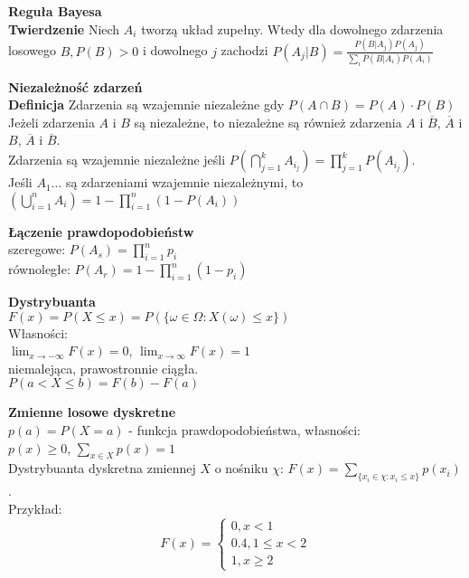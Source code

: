 \documentclass[10pt,landscape,a4paper,notitlepage]{article}
\begin{document}
\begin{multicols*}{4}
        \noindent \textbf{\large Reguła Bayesa}\\
        \textbf{Twierdzenie} Niech $A_i$ tworzą układ zupełny. Wtedy dla dowolnego zdarzenia losowego $B, P(B)>0$ i dowolnego $j$ zachodzi $P(A_j|B)=\frac{P(B|A_j)P(A_j)}{\sum_iP(B|A_i)P(A_i)}$

        \noindent \textbf{\large Niezależność zdarzeń}\\
        \textbf{Definicja} Zdarzenia są wzajemnie niezależne gdy $P(A\cap B)=P(A)\cdot P(B)$\\
        Jeżeli zdarzenia $A$ i $B$ są niezależne, to niezależne są również zdarzenia $A$ i $\overline{B}$, $\overline{A}$ i $B$, $\overline{A}$ i $\overline{B}$.\\
        Zdarzenia są wzajemnie niezależne jeśli $P\left(\bigcap_{j=1}^kA_{i_j}\right) = \prod_{j=1}^kP(A_{i_j})$.\\
        Jeśli $A_1\ldots$ są zdarzeniami wzajemnie niezależnymi, to $\left(\bigcup_{i=1}^nA_i\right)=1-\prod_{i=1}^n(1-P(A_i))$

        \noindent\textbf{\large Łączenie prawdopodobieństw}\\
        szeregowe: $P(A_s)=\prod_{i=1}^np_i$\\
        równoległe: $P(A_r)=1-\prod_{i=1}^n(1-p_i)$

        \noindent\textbf{\large Dystrybuanta}\\
        $F(x)=P(X\leq x) = P(\{\omega\in\Omega : X(\omega)\leq x\})$\\
        Własności:\\
        $\lim_{x\rightarrow-\infty}F(x)=0$, $\lim_{x\rightarrow\infty}F(x)=1$\\
        niemalejąca, prawostronnie ciągła.\\
        $P(a<X\leq b)=F(b)-F(a)$

        \noindent\textbf{\large Zmienne losowe dyskretne}\\
        $p(a) = P(X=a)$ - funkcja prawdopodobieństwa, własności:\\
        $p(x)\geq 0$, $\sum_{x\in X}p(x)=1$\\
        Dystrybuanta dyskretna zmiennej $X$ o nośniku $\chi$: $F(x)=\sum_{\{x_i\in \chi:x_i\leq x\}}p(x_i)$.\\
        Przykład:
        \[
            F(x)=
            \begin{cases}
                0, x<1\\
                0.4, 1\leq x<2\\
                1, x\geq 2
            \end{cases}
        \]
        

\end{multicols*}
\end{document}
